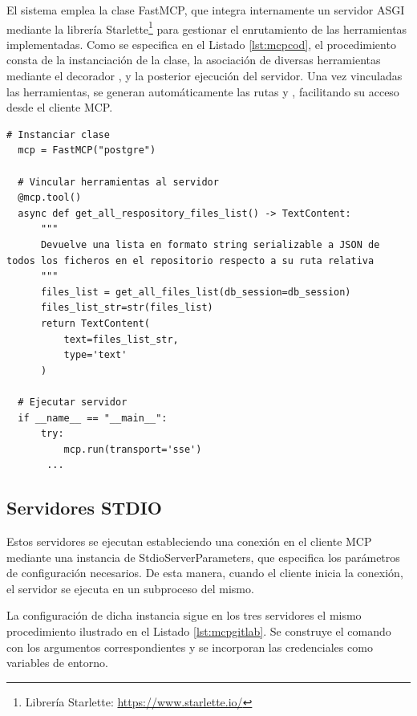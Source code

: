 \begin{itemize}
  El sistema emplea la clase FastMCP, que integra internamente un servidor ASGI mediante la librería Starlette\footnote{Librería Starlette: \url{https://www.starlette.io/}} para gestionar el enrutamiento de las herramientas implementadas. Como se especifica en el Listado \ref{lst:mcpcod}, el procedimiento consta de la instanciación de la clase, la asociación de diversas herramientas mediante el decorador , y la posterior ejecución del servidor. Una vez vinculadas las herramientas, se generan automáticamente las rutas  y , facilitando su acceso desde el cliente MCP.

\begin{lstlisting}[caption={\protect\opus{mcp_code_server.py:} ejecución del servidor MCP con acceso al código fuente},label={lst:mcpcod}]
  # Instanciar clase 
  mcp = FastMCP("postgre")

  # Vincular herramientas al servidor
  @mcp.tool()
  async def get_all_respository_files_list() -> TextContent:
      """
      Devuelve una lista en formato string serializable a JSON de todos los ficheros en el repositorio respecto a su ruta relativa
      """
      files_list = get_all_files_list(db_session=db_session)
      files_list_str=str(files_list)
      return TextContent(
          text=files_list_str,
          type='text'
      )

  # Ejecutar servidor
  if __name__ == "__main__":
      try:
          mcp.run(transport='sse')
       ...

\end{lstlisting}


\end{itemize}

\subsection{Servidores STDIO}
\label{sec:stdio}
Estos servidores se ejecutan estableciendo una conexión en el cliente MCP mediante una instancia de StdioServerParameters, que especifica los parámetros de configuración necesarios. De esta manera, cuando el cliente inicia la conexión, el servidor se ejecuta en un subproceso del mismo.

La configuración de dicha instancia sigue en los tres servidores el mismo procedimiento ilustrado en el Listado \ref{lst:mcpgitlab}. Se construye el comando con los argumentos correspondientes y se incorporan las credenciales como variables de entorno.

